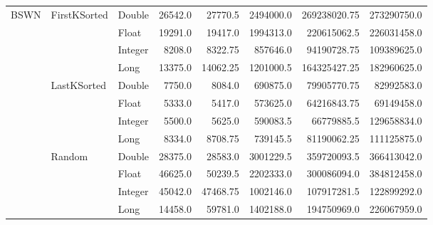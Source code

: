 \documentclass[unicode,11pt,a4paper,oneside,numbers=endperiod,openany]{scrartcl}
\begin{document}
\begin{center}
\begin{longtable}{|l|l|l|r|r|r|r|r|}
            \multirow{12}{*}{BSWN} & \multirow{4}{*}{FirstKSorted} & Double & 26542.0 & 27770.5 & 2494000.0 & 269238020.75 & 273290750.0 \\
            & & Float & 19291.0 & 19417.0 & 1994313.0 & 220615062.5 & 226031458.0 \\
            & & Integer & 8208.0 & 8322.75 & 857646.0 & 94190728.75 & 109389625.0 \\
            & & Long & 13375.0 & 14062.25 & 1201000.5 & 164325427.25 & 182960625.0 \\
            \cline{2-8}
            & \multirow{4}{*}{LastKSorted} & Double & 7750.0 & 8084.0 & 690875.0 & 79905770.75 & 82992583.0 \\
            & & Float & 5333.0 & 5417.0 & 573625.0 & 64216843.75 & 69149458.0 \\
            & & Integer & 5500.0 & 5625.0 & 590083.5 & 66779885.5 & 129658834.0 \\
            & & Long & 8334.0 & 8708.75 & 739145.5 & 81190062.25 & 111125875.0 \\
            \cline{2-8}
            & \multirow{4}{*}{Random} & Double & 28375.0 & 28583.0 & 3001229.5 & 359720093.5 & 366413042.0 \\
            & & Float & 46625.0 & 50239.5 & 2202333.0 & 300086094.0 & 384812458.0 \\
            & & Integer & 45042.0 & 47468.75 & 1002146.0 & 107917281.5 & 122899292.0 \\
            & & Long & 14458.0 & 59781.0 & 1402188.0 & 194750969.0 & 226067959.0 \\
            \hline
    

\end{longtable}
\end{center}
\end{document}
